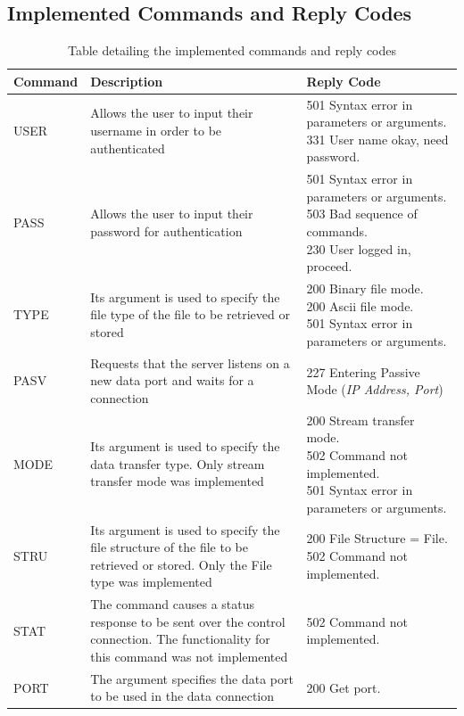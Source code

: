 \documentclass[10pt,twocolumn]{witseiepaper}
\begin{document}
\begin{appendix}
\section{Implemented Commands and Reply Codes}
\setcounter{table}{0}
\renewcommand{\thetable}{B\arabic{table}}

\begin{longtable}{|p{2cm}|p{7cm}|p{7cm}|}
		\caption{Table detailing the implemented commands and reply codes}
		\label{tab:commands} \\
	\hline 
	Command & Description & Reply Code \\ 
	\hline 
	\hline
USER	& Allows the user to input their username in order to be authenticated  &  501 Syntax error in parameters or arguments. 331 User name okay, need password. \\ 
	\hline 
PASS	& Allows the user to input their password for authentication & \makecell[l]{501 Syntax error in parameters or arguments.\\503 Bad sequence of commands. \\230 User logged in, proceed.} \\ 
	\hline 
TYPE	& Its argument is used to specify the file type of the file to be retrieved or stored & \makecell[l]{200 Binary file mode.\\200 Ascii file mode. \\501 Syntax error in parameters or arguments.}\\ 
	\hline 
PASV	& Requests that the server listens on a new data port and waits for a connection & 227 Entering Passive Mode (\textit{IP Address, Port}) \\ 
	\hline 
MODE	& Its argument is used to specify the data transfer type. Only stream transfer mode was implemented & \makecell[l]{200 Stream transfer mode. \\502 Command not implemented. \\501 Syntax error in parameters or arguments.} \\ 
	\hline 
STRU	& Its argument is used to specify the file structure of the file to be retrieved or stored. Only the File type was implemented  & \makecell[l]{200 File Structure = File. \\502 Command not implemented.} \\ 
	\hline 
STAT	& The command causes a status response to be sent over the control connection. The functionality for this command was not implemented & 502 Command not implemented. \\ 
	\hline 
PORT	& The argument specifies the data port to be used in the data connection & 200 Get port. \\ 

\end{longtable}
\end{appendix}
\end{document}
